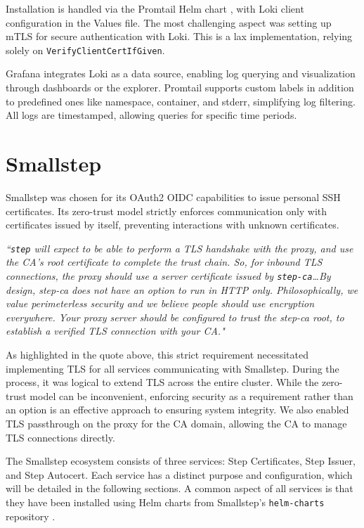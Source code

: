Installation is handled via the Promtail Helm chart \parencite{grafana_promtail_helm}, with Loki client configuration in the Values file. The most challenging aspect was setting up mTLS for secure authentication with Loki. This is a lax implementation, relying solely on \texttt{VerifyClientCertIfGiven}.

Grafana integrates Loki as a data source, enabling log querying and visualization through dashboards or the explorer. Promtail supports custom labels in addition to predefined ones like namespace, container, and stderr, simplifying log filtering. All logs are timestamped, allowing queries for specific time periods.

\section{Smallstep}\label{sec:smallstep}
Smallstep was chosen for its OAuth2 OIDC capabilities to issue personal SSH certificates. Its zero-trust model strictly enforces communication only with certificates issued by itself, preventing interactions with unknown certificates.

\begin{displayquote}
    \textit{``\texttt{step} will expect to be able to perform a TLS handshake with the proxy, and use the CA's root certificate to complete the trust chain. So, for inbound TLS connections, the proxy should use a server certificate issued by \texttt{step-ca}\ldots By design, step-ca does not have an option to run in HTTP only. Philosophically, we value perimeterless security and we believe people should use encryption everywhere. Your proxy server should be configured to trust the step-ca root, to establish a verified TLS connection with your CA."\parencite{smallstep_step_ca}}
\end{displayquote}
    \hspace*{}

As highlighted in the quote above, this strict requirement necessitated implementing TLS for all services communicating with Smallstep. During the process, it was logical to extend TLS across the entire cluster. While the zero-trust model can be inconvenient, enforcing security as a requirement rather than an option is an effective approach to ensuring system integrity. We also enabled TLS passthrough on the proxy for the CA domain, allowing the CA to manage TLS connections directly.

The Smallstep ecosystem consists of three services: Step Certificates, Step Issuer, and Step Autocert. Each service has a distinct purpose and configuration, which will be detailed in the following sections. A common aspect of all services is that they have been installed using Helm charts from Smallstep's \texttt{helm-charts} repository \parencite{smallstep_helm_charts}.

